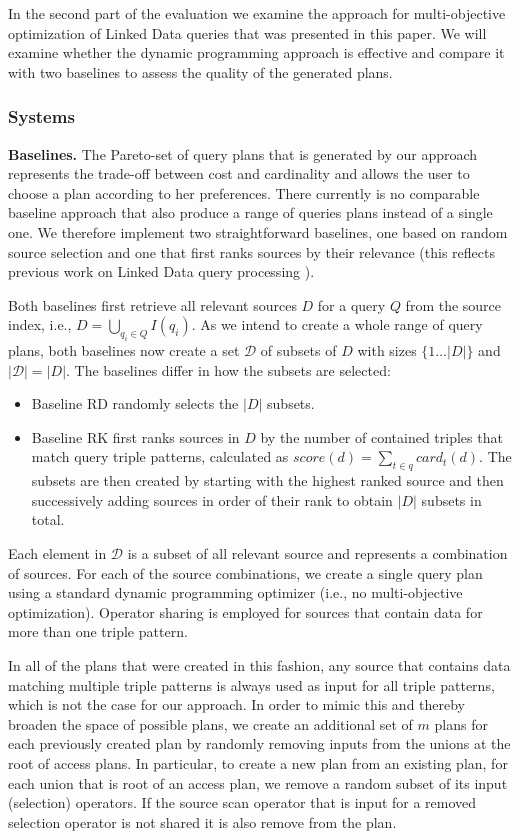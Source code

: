 In the second part of the evaluation we examine the approach for
multi-objective optimization of Linked Data queries that was presented
in this paper. We will examine whether the dynamic programming
approach is effective and compare it with two baselines to assess the
quality of the generated plans.

\subsubsection{Systems}

\textbf{Baselines.} The Pareto-set of query plans that is generated by
our approach represents the trade-off between cost and cardinality and
allows the user to choose a plan according to her preferences. There
currently is no comparable baseline approach that also produce a range
of queries plans instead of a single one. We therefore implement two
straightforward baselines, one based on random source selection and
one that first ranks sources by their relevance (this reflects
previous work on Linked Data query processing
\cite{harth_data_2010,ladwig_linked_2010}).

Both baselines first retrieve all relevant sources $D$ for a query $Q$
from the source index, i.e., $D = \bigcup_{q_i \in Q} I(q_i)$. As we
intend to create a whole range of query plans, both baselines now
create a set $\mathcal{D}$ of subsets of $D$ with sizes $\{1\ldots
|D|\}$ and $|\mathcal{D}| = |D|$. The baselines differ in how the
subsets are selected:
\begin{itemize}
\item Baseline RD randomly selects the $|D|$ subsets.
\item Baseline RK first ranks sources in $D$ by the number of
  contained triples that match query triple patterns, calculated as
  $score(d) = \sum_{t \in q} card_t(d)$. The subsets are then created
  by starting with the highest ranked source and then successively
  adding sources in order of their rank to obtain $|D|$ subsets in
  total.
\end{itemize}
Each element in $\mathcal{D}$ is a subset of all relevant source and
represents a combination of sources. For each of the source
combinations, we create a single query plan using a standard dynamic
programming optimizer (i.e., no multi-objective
optimization). Operator sharing is employed for sources that contain
data for more than one triple pattern.

In all of the plans that were created in this fashion, any source that
contains data matching multiple triple patterns is always used as
input for all triple patterns, which is not the case for our
approach. In order to mimic this and thereby broaden the space of
possible plans, we create an additional set of $m$ plans for each
previously created plan by randomly removing inputs from the unions at
the root of access plans. In particular, to create a new plan from an
existing plan, for each union that is root of an access plan, we
remove a random subset of its input (selection) operators. If the
source scan operator that is input for a removed selection operator is
not shared it is also remove from the plan.

